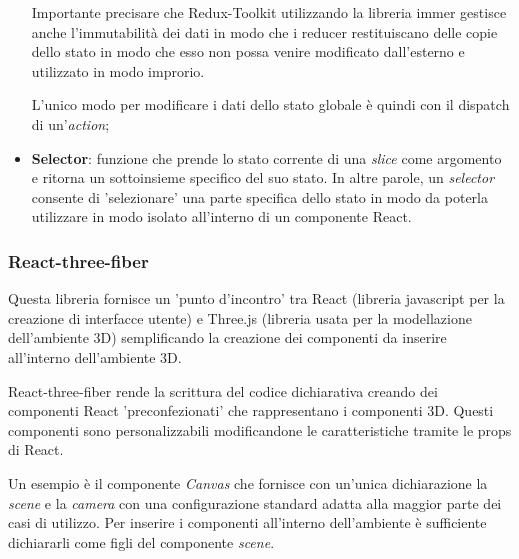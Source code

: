 \begin{itemize}
	Importante precisare che Redux-Toolkit utilizzando 
	la libreria immer gestisce anche l'immutabilità dei dati in modo che i reducer restituiscano delle copie dello stato in modo che esso non possa 
	venire modificato dall'esterno e utilizzato in modo improrio.
	
	L'unico modo per modificare i dati dello stato globale è quindi con il dispatch di un'\textit{action};
	\item \textbf{Selector}: funzione che prende lo stato corrente di una \textit{slice} come argomento e ritorna un sottoinsieme specifico
	del suo stato. In altre parole, un \textit{selector} consente di 'selezionare' una parte specifica dello stato
	in modo da poterla utilizzare in modo isolato all'interno di un componente React.
\end{itemize}

\subsubsection{React-three-fiber}
Questa libreria fornisce un 'punto d'incontro' tra React (libreria javascript per la creazione di interfacce utente) e Three.js (libreria usata per
la modellazione dell'ambiente 3D) semplificando la creazione dei componenti da inserire all'interno dell'ambiente 3D.

React-three-fiber rende la scrittura del codice dichiarativa creando dei componenti React 'preconfezionati' che rappresentano i componenti 3D.
Questi componenti sono personalizzabili modificandone le caratteristiche tramite le props di React.

Un esempio è il componente \textit{Canvas} che fornisce con un'unica dichiarazione la \textit{scene} e la \textit{camera} con una configurazione standard 
adatta alla maggior parte dei casi di utilizzo. Per inserire i componenti all'interno dell'ambiente è sufficiente dichiararli come figli del 
componente \textit{scene}.
